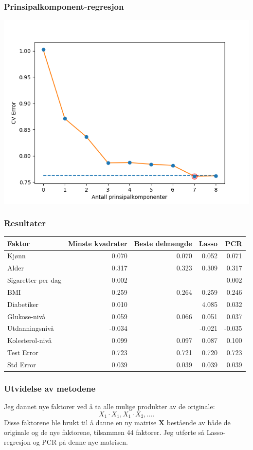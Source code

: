 \documentclass[aspectratio=169]{beamer}
\begin{document}
\begin{frame}
  \frametitle{Prinsipalkomponent-regresjon}
  \begin{center}
    \includegraphics[height=0.8\textheight]{pcr_CV.png}
  \end{center}
\end{frame}

\begin{frame}
  \frametitle{Resultater}
  \begin{tabular}{ l r r r r}
    Faktor & Minste kvadrater & Beste delmengde & Lasso & PCR \\
    \hline
    Kjønn & 0.070 & 0.070 & 0.052 & 0.071 \\
    Alder & 0.317 & 0.323 & 0.309 & 0.317 \\
    Sigaretter per dag & 0.002 & & & 0.002 \\
    BMI & 0.259 & 0.264 & 0.259 & 0.246 \\
    Diabetiker & 0.010 & & 4.085 & 0.032 \\
    Glukose-nivå & 0.059 & 0.066 & 0.051 & 0.037 \\
    Utdanningsnivå & -0.034 & & -0.021 & -0.035 \\
    Kolesterol-nivå & 0.099 & 0.097 & 0.087 & 0.100 \\
    \hline
    Test Error & 0.723 & 0.721 & 0.720 & 0.723 \\
    Std Error & 0.039 & 0.039 & 0.039 & 0.039 \\
  \end{tabular}
\end{frame}

\begin{frame}
  \frametitle{Utvidelse av metodene}

  Jeg dannet nye faktorer ved å ta alle mulige produkter av de originale: \[X_1 \cdot X_1, X_1 \cdot X_2, \dots.\]
  \pause
  Disse faktorene ble brukt til å danne en ny matrise \(\textbf{X}\) bestående av både de originale og de nye faktorene, tilsammen 44 faktorer.
  \pause
  Jeg utførte så Lasso-regresjon og PCR på denne nye matrisen.
\end{frame}
\end{document}
